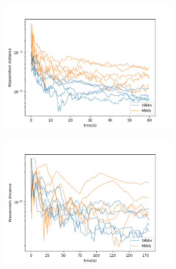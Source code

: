 \begin{figure}[h]
    \centering
    \begin{subfigure}{0.3\linewidth}
    	\centering
        \includegraphics[width=\linewidth]{../../plots/KL_M2_N50_NMCMC1_seed0_diffind2.png}
    \end{subfigure}
    \begin{subfigure}{0.3\linewidth}
        \centering
    	\includegraphics[width=\linewidth]{../../plots/KL_M2_N20000_NMCMC3_seed0_diffind2.png}
	\end{subfigure}
	\begin{subfigure}{0.3\linewidth}
	    \centering

\end{subfigure}
\end{figure}
